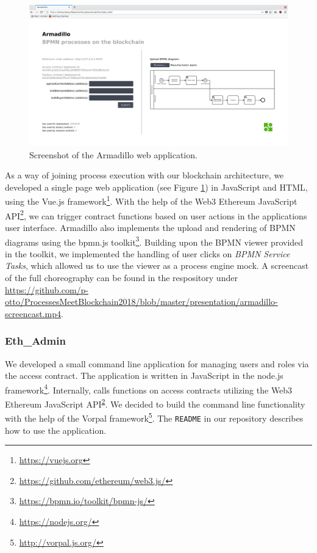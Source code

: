 \documentclass[runningheads]{llncs}
\begin{document}
\begin{figure}
	\centering
\includegraphics[width=\textwidth]{fig/Armadillo.png}
\caption{Screenshot of the Armadillo web application.}
\label{fig:armadillo}
\end{figure}

As a way of joining process execution with our blockchain architecture, we developed a single page web application (see Figure \ref{fig:armadillo}) in JavaScript and HTML, using the Vue.js framework\footnote{\url{https://vuejs.org}}.
With the help of the Web3 Ethereum JavaScript API\footnote{\label{web3}\url{https://github.com/ethereum/web3.js/}}, we can trigger contract functions based on user actions in the applications user interface.
Armadillo also implements the upload and rendering of BPMN diagrams using the bpmn.js toolkit\footnote{\url{https://bpmn.io/toolkit/bpmn-js/}}.
Building upon the BPMN viewer provided in the toolkit, we implemented the handling of user clicks on \emph{BPMN Service Tasks}, which allowed us to use the viewer as a process engine mock.
A screencast of the full choreography can be found in the respository under \url{https://github.com/p-otto/ProcessesMeetBlockchain2018/blob/master/presentation/armadillo-screencast.mp4}.

\subsubsection{Eth\_Admin}

We developed a small command line application for managing users and roles via the access contract.
The application is written in JavaScript in the node.js framework\footnote{\url{https://nodejs.org/}}.
Internally, calls functions on access contracts utilizing the Web3 Ethereum JavaScript API\textsuperscript{\ref{web3}}.
We decided to build the command line functionality with the help of the Vorpal framework\footnote{\url{http://vorpal.js.org/}}.
The \texttt{README} in our repository describes how to use the application.
\end{document}

